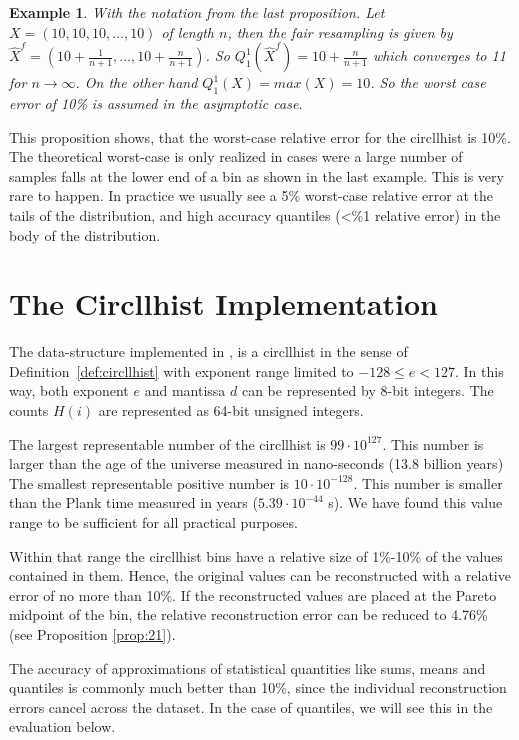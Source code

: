 \documentclass{article}
\theoremstyle{plain}
\newtheorem{example}[definition]{Example}
\theoremstyle{remark}
\newcommand{\ra}{\rightarrow}
\begin{document}
\begin{example}
  With the notation from the last proposition.  Let $X=(10,10,10, \dots, 10)$ of length $n$, then
  the fair resampling is given by $\hat{X}^f = (10 + \frac{1}{n+1}, \dots, 10 + \frac{n}{n+1})$.
  So $Q^1_1(\hat{X}^f) = 10 + \frac{n}{n+1}$ which converges to 11 for $n \ra \infty$.
  On the other hand $Q^1_1(X) = max(X) = 10$. So the worst case error of 10\% is assumed in
  the asymptotic case.
\end{example}

This proposition shows, that the worst-case relative error for the circllhist is 10\%.  The
theoretical worst-case is only realized in cases were a large number of samples falls at the lower
end of a bin as shown in the last example.  This is very rare to happen.  In practice we usually
see a 5\% worst-case relative error at the tails of the distribution, and high accuracy
quantiles (<\%1 relative error) in the body of the distribution.

\section{The Circllhist Implementation}

The data-structure implemented in \cite{libcircllhist}, is a circllhist in the sense of
Definition~\ref{def:circllhist} with exponent range limited to $-128 \leq e < 127$.
In this way, both exponent $e$ and mantissa $d$ can be represented by 8-bit integers.
The counts $H(i)$ are represented as 64-bit unsigned integers.

The largest representable number of the circllhist is $99 \cdot 10^{127}$.
This number is larger than the age of the universe measured in nano-seconds (13.8 billion years)
The smallest representable positive number is $10 \cdot 10^{-128}$.
This number is smaller than the Plank time measured in years ($5.39 \cdot 10^{-44}$ s).
We have found this value range to be sufficient for all practical purposes.

Within that range the circllhist bins have a relative size of 1\%-10\% of the values contained in
them. Hence, the original values can be reconstructed with a relative error of no more than 10\%.
If the reconstructed values are placed at the Pareto midpoint of the bin, the relative reconstruction
error can be reduced to 4.76\% (see Proposition \ref{prop:21}).

The accuracy of approximations of statistical quantities like sums, means and quantiles is commonly
much better than 10\%, since the individual reconstruction errors cancel across the dataset.
In the case of quantiles, we will see this in the evaluation below.
\end{document}
